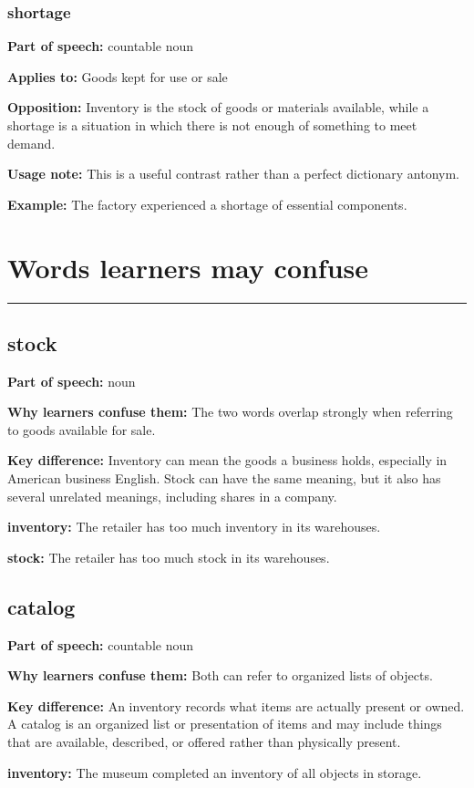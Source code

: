 \documentclass[11pt]{article}
\newcommand{\sectionrule}{\par\vspace{-0.5em}\noindent\textcolor{Accent}{\rule{\linewidth}{0.6pt}}\par}
\begin{document}
\subsubsection{shortage}
\textbf{Part of speech:} countable noun

\textbf{Applies to:} Goods kept for use or sale

\textbf{Opposition:} Inventory is the stock of goods or materials available, while a shortage is a situation in which there is not enough of something to meet demand.

\textbf{Usage note:} This is a useful contrast rather than a perfect dictionary antonym.

\textbf{Example:} The factory experienced a shortage of essential components.

\section{Words learners may confuse}
\sectionrule
\subsection{stock}
\textbf{Part of speech:} noun

\textbf{Why learners confuse them:} The two words overlap strongly when referring to goods available for sale.

\textbf{Key difference:} Inventory can mean the goods a business holds, especially in American business English. Stock can have the same meaning, but it also has several unrelated meanings, including shares in a company.

\textbf{inventory:} The retailer has too much inventory in its warehouses.

\textbf{stock:} The retailer has too much stock in its warehouses.

\subsection{catalog}
\textbf{Part of speech:} countable noun

\textbf{Why learners confuse them:} Both can refer to organized lists of objects.

\textbf{Key difference:} An inventory records what items are actually present or owned. A catalog is an organized list or presentation of items and may include things that are available, described, or offered rather than physically present.

\textbf{inventory:} The museum completed an inventory of all objects in storage.
\end{document}
